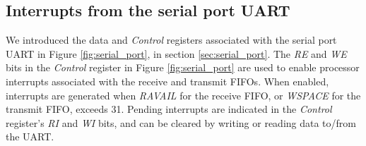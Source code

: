 \subsection{Interrupts from the serial port UART}

We introduced the data and {\it Control} registers associated with the serial port UART in Figure
\ref{fig:serial_port}, in section \ref{sec:serial_port}.
The {\it RE} and {\it WE} bits in the {\it Control} register in Figure \ref{fig:serial_port} are used to 
enable processor interrupts associated with the receive and transmit FIFOs. When enabled, 
interrupts are generated when {\it RAVAIL} for the receive FIFO, or {\it WSPACE} for
the transmit FIFO, exceeds 31. Pending interrupts are indicated in the {\it Control}
register's {\it RI} and {\it WI} bits, and can be cleared by writing or reading data
to/from the UART.